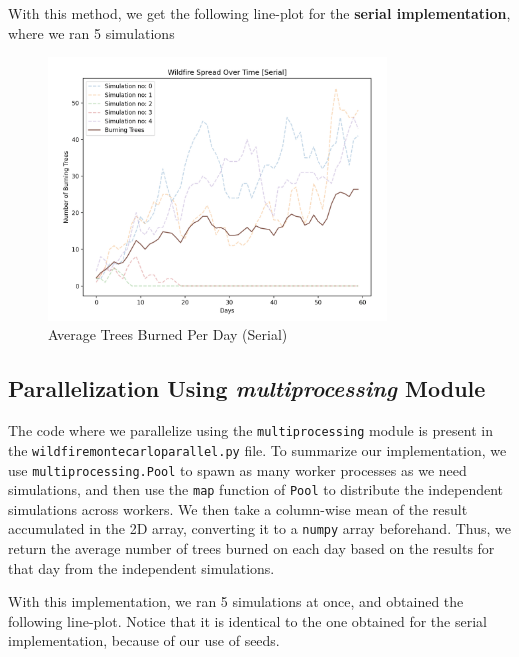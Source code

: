 \documentclass[a4paper,12pt]{article}
\begin{document}
With this method, we get the following line-plot for the \textbf{serial implementation}, where we ran 5 simulations


\begin{figure}[H]
  \centering
  \includegraphics[width=0.8\textwidth]{../images/a4_ex1_serial_example.png}
  \caption{Average Trees Burned Per Day (Serial)}
\end{figure}


\subsection{Parallelization Using \textit{multiprocessing} Module}
The code where we parallelize using the \verb|multiprocessing| module is present in the \verb|wildfiremontecarloparallel.py| file. To summarize our implementation, we use \verb|multiprocessing.Pool| to spawn as many worker processes as we need simulations, and then use the \verb|map| function of \verb|Pool| to distribute the independent simulations across workers. We then take a column-wise mean of the result accumulated in the 2D array, converting it to a \verb|numpy| array beforehand. Thus, we return the average number of trees burned on each day based on the results for that day from the independent simulations.

With this implementation, we ran 5 simulations at once, and obtained the following line-plot. Notice that it is identical to the one obtained for the serial implementation, because of our use of seeds.
\end{document}

